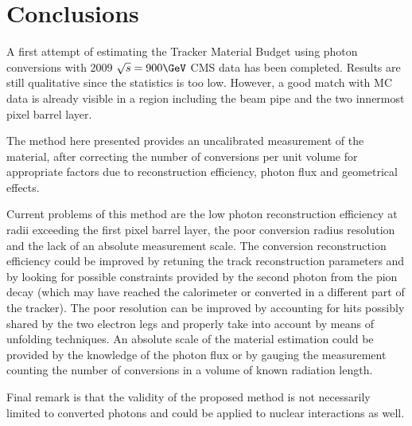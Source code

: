 \section{Conclusions}
\label{section_conclusions}

A first attempt of estimating the Tracker Material Budget using photon conversions with 2009 $\sqrt{s}=900\GeV$ CMS 
data has been completed.
Results are still qualitative since the statistics is too low. 
However, a good match with MC data is already visible in a region including the beam pipe and the two innermost pixel barrel layer.

The method here presented provides an uncalibrated measurement of the material, after correcting the number of conversions per unit volume 
for appropriate factors due to reconstruction efficiency, photon flux and geometrical effects. 

Current problems of this method are the low photon reconstruction efficiency at radii exceeding the first pixel barrel layer, the poor
conversion radius resolution and the lack of an absolute measurement scale.
The conversion reconstruction efficiency could be improved by retuning the track reconstruction parameters and 
by looking for possible constraints provided by the second photon from the pion decay 
(which may have reached the calorimeter or converted in a different part of the tracker).
The poor resolution can be improved by accounting for hits possibly shared by the two electron legs and properly take into account by means of 
unfolding techniques.
An absolute scale of the material estimation could be provided by the knowledge of the photon flux or by gauging the measurement 
counting the number of conversions in a volume of known radiation length.

Final remark is that the validity of the proposed method is not necessarily limited to converted photons and could be applied to
nuclear interactions as well.


